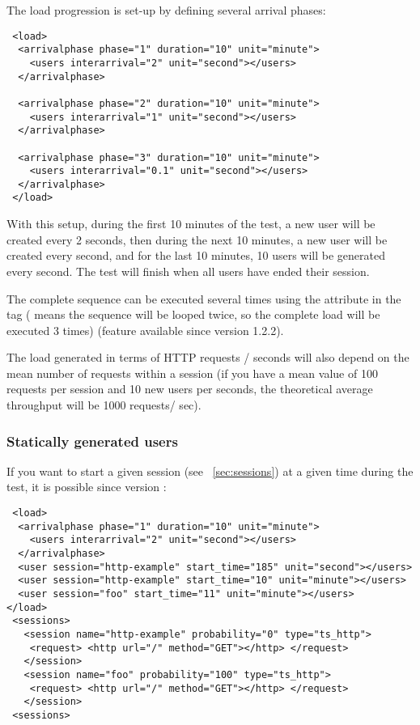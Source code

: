 \documentclass{TSUNG-en}
\begin{document}
The load progression is set-up by defining several arrival phases:

\begin{Verbatim}
 <load>
  <arrivalphase phase="1" duration="10" unit="minute">
    <users interarrival="2" unit="second"></users>
  </arrivalphase>

  <arrivalphase phase="2" duration="10" unit="minute">
    <users interarrival="1" unit="second"></users>
  </arrivalphase>

  <arrivalphase phase="3" duration="10" unit="minute">
    <users interarrival="0.1" unit="second"></users>
  </arrivalphase>
 </load>
\end{Verbatim}

With this setup, during the first 10 minutes of the test, a new user
will be created every 2 seconds, then during the next 10 minutes, a
new user will be created every second, and for the last 10 minutes,
10 users will be generated every second. The test will finish when
all users have ended their session.

The complete sequence can be executed several times using the
 attribute in the  tag
( means the sequence will be looped twice, so the
complete load will be executed 3 times) (feature available since
version 1.2.2).

The load generated in terms of HTTP requests / seconds will also
depend on the mean number of requests within a session (if you have a
mean value of 100 requests per session and 10 new users per seconds,
the theoretical average throughput will be 1000 requests/ sec).

\subsubsection{Statically generated users}

If you want to start a given session (see ~\ref{sec:sessions}) at a given time during the test,
it is possible since version :
\begin{Verbatim}
 <load>
  <arrivalphase phase="1" duration="10" unit="minute">
    <users interarrival="2" unit="second"></users>
  </arrivalphase>
  <user session="http-example" start_time="185" unit="second"></users>
  <user session="http-example" start_time="10" unit="minute"></users>
  <user session="foo" start_time="11" unit="minute"></users>
</load>
 <sessions>
   <session name="http-example" probability="0" type="ts_http">
    <request> <http url="/" method="GET"></http> </request>
   </session>
   <session name="foo" probability="100" type="ts_http">
    <request> <http url="/" method="GET"></http> </request>
   </session>
 <sessions>
\end{Verbatim}
\end{document}
